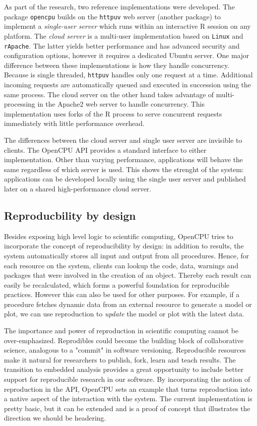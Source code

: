 As part of the research, two reference implementations were developed. The \R package \texttt{opencpu} builds on the \texttt{httpuv} web server (another \R package) to implement a \emph{single-user server} which runs within an interactive R session on any platform. The \emph{cloud server} is a multi-user implementation based on \texttt{Linux} and \texttt{rApache}. The latter yields better performance and has advanced security and configuration options, however it requires a dedicated Ubuntu server. One major difference between these implementations is how they handle concurrency. Because \R is single threaded, \texttt{httpuv} handles only one request at a time. Additional incoming requests are automatically queued and executed in succession using the same process. The cloud server on the other hand takes advantage of multi-processing in the Apache2 web server to handle concurrency. This implementation uses forks of the R process to serve concurrent requests immediately with little performance overhead. 

The differences between the cloud server and single user server are invisible to clients. The OpenCPU API provides a standard interface to either implementation. Other than varying performance, applications will behave the same regardless of which server is used. This shows the strenght of the system: applications can be developed locally using the single user server and published later on a shared high-performance cloud server.

\subsection{Reproducbility by design}

Besides exposing high level logic to scientific computing, OpenCPU tries to incorporate the concept of reproducibility by design: in addition to results, the system automatically stores all input and output from all procedures. Hence, for each resource on the system, clients can lookup the code, data, warnings and packages that were involved in the creation of an object. Thereby each result can easily be recalculated, which forms a powerful foundation for reproducible practices. However this can also be used for other purposes. For example, if a procedure fetches dynamic data from an external resource to generate a model or plot, we can use reproduction to \emph{update} the model or plot with the latest data.

The importance and power of reproduction in scientific computing cannot be over-emphasized. Reprodibles could become the building block of collaborative science, analogous to a "commit" in software versioning. Reproducible resources make it natural for researchers to publish, fork, learn and teach results. The transition to embedded analysis provides a great opportunity to include better support for reproducible research in our software. By incorporating the notion of reproduction in the API, OpenCPU sets an example that turns reproduction into a native aspect of the interaction with the system. The current implementation is pretty basic, but it can be extended and is a proof of concept that illustrates the direction we should be headering.  

